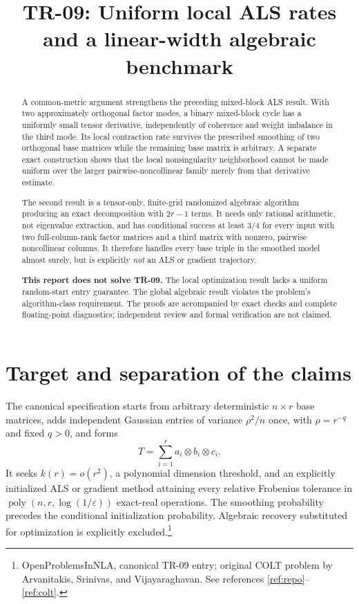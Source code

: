 \documentclass[11pt]{article}
\title{TR-09: Uniform local ALS rates and a linear-width algebraic benchmark}
\author{}\date{}
\theoremstyle{remark}\newtheorem{remark}[theorem]{Remark}
\begin{document}
\maketitle
\vspace{-1.4em}
\begin{abstract}
A common-metric argument strengthens the preceding mixed-block ALS result. With two approximately orthogonal factor modes, a binary mixed-block cycle has a uniformly small tensor derivative, independently of coherence and weight imbalance in the third mode. Its local contraction rate survives the prescribed smoothing of two orthogonal base matrices while the remaining base matrix is arbitrary. A separate exact construction shows that the local nonsingularity neighborhood cannot be made uniform over the larger pairwise-noncollinear family merely from that derivative estimate.

The second result is a tensor-only, finite-grid randomized algebraic algorithm producing an exact decomposition with $2r-1$ terms. It needs only rational arithmetic, not eigenvalue extraction, and has conditional success at least $3/4$ for every input with two full-column-rank factor matrices and a third matrix with nonzero, pairwise noncollinear columns. It therefore handles every base triple in the smoothed model almost surely, but is explicitly \emph{not} an ALS or gradient trajectory.

\textbf{This report does not solve TR-09.} The local optimization result lacks a uniform random-start entry guarantee. The global algebraic result violates the problem's algorithm-class requirement. The proofs are accompanied by exact checks and complete floating-point diagnostics; independent review and formal verification are not claimed.
\end{abstract}

\section{Target and separation of the claims}
The canonical specification starts from arbitrary deterministic $n\times r$ base matrices, adds independent Gaussian entries of variance $\rho^2/n$ once, with $\rho=r^{-q}$ and fixed $q>0$, and forms
\begin{equation}\label{eq:target}
 T=\sum_{i=1}^r a_i\otimes b_i\otimes c_i.
\end{equation}
It seeks $k(r)=o(r^2)$, a polynomial dimension threshold, and an explicitly initialized ALS or gradient method attaining every relative Frobenius tolerance in $\operatorname{poly}(n,r,\log(1/\varepsilon))$ exact-real operations. The smoothing probability precedes the conditional initialization probability. Algebraic recovery substituted for optimization is explicitly excluded.\footnote{OpenProblemsInNLA, canonical TR-09 entry; original COLT problem by Arvanitakis, Srinivas, and Vijayaraghavan. See references \ref{ref:repo}--\ref{ref:colt}.}
\end{document}
